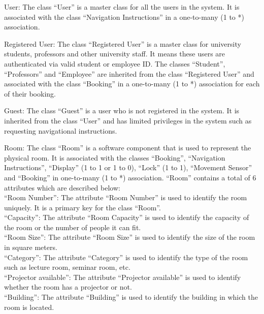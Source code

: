 \documentclass[conference,onecolumn]{IEEEtran}
\begin{document}
		User: The class ``User'' is a master class for all the users in the system. It is associated with the class ``Navigation Instructions'' in a one-to-many (1 to *) association.

		Registered User: The class ``Registered User'' is a master class for university students, professors and other university staff. It means these users are authenticated via valid student or employee ID. The classes ``Student'', ``Professors'' and ``Employee'' are inherited from the class ``Registered User'' and associated with the class ``Booking'' in a one-to-many (1 to *) association for each of their booking.

		Guest: The class ``Guest'' is a user who is not registered in the system. It is inherited from the class ``User'' and has limited privileges in the system such as requesting navigational instructions.


		Room: The class ``Room'' is a software component that is used to represent the physical room. It is associated with the classes ``Booking'', ``Navigation Instructions'', ``Display'' (1 to 1 or 1 to 0), ``Lock'' (1 to 1), ``Movement Sensor'' and ``Booking'' in one-to-many (1 to *) association. ``Room'' contains a total of 6 attributes which are described below:\\
		``Room Number'': The attribute ``Room Number'' is used to identify the room uniquely. It is a primary key for the class ``Room''.\\
		``Capacity'': The attribute ``Room Capacity'' is used to identify the capacity of the room or the number of people it can fit.\\
		``Room Size'': The attribute ``Room Size'' is used to identify the size of the room in square meters.\\
		``Category'': The attribute ``Category'' is used to identify the type of the room such as lecture room, seminar room, etc.\\
		``Projector available'': The attribute ``Projector available'' is used to identify whether the room has a projector or not.\\
		``Building'': The attribute ``Building'' is used to identify the building in which the room is located.


\end{document}
